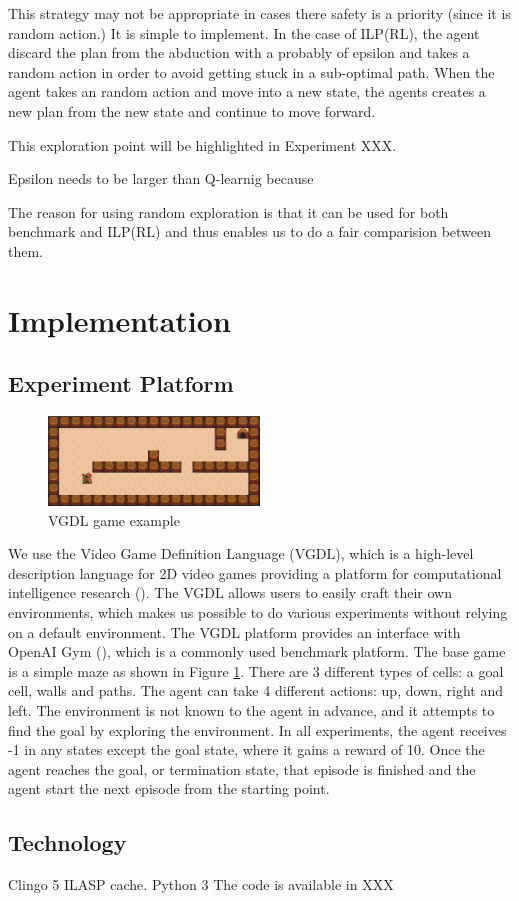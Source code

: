 This strategy may not be appropriate in cases there safety is a priority (since it is random action.)
It is simple to implement. 
In the case of ILP(RL), the agent discard the plan from the abduction with a probably of epsilon and takes a random action in order to avoid getting stuck in a sub-optimal path. 
When the agent takes an random action and move into a new state, the agents creates a new plan from the new state and continue to move forward.

This exploration point will be highlighted in Experiment XXX.

Epsilon needs to be larger than Q-learnig because

The reason for using random exploration is that it can be used for both benchmark and ILP(RL) and thus enables us to do a fair comparision between them.

\section{Implementation}
\label{Implementation}

\subsection{Experiment Platform}

\begin{figure}[!ht!b]
\centering
\includegraphics[width=0.5\textwidth]{./figures/experiment1}
\caption{VGDL game example}
\label{VGDL_sample}
\end{figure}    

We use the Video Game Definition Language (VGDL), which is a high-level description language for 2D video games providing a platform for computational intelligence research (\cite{Schaul2013}).
The VGDL allows users to easily craft their own environments, which makes us possible to do various experiments without relying on a default environment. The VGDL platform provides an interface with OpenAI Gym (\cite{Brockman2016}), which is a commonly used benchmark platform. 
The base game is a simple maze as shown in Figure \ref{VGDL_sample}.
There are 3 different types of cells: a goal cell, walls and paths. The agent can take 4 different actions: up, down, right and left.
The environment is not known to the agent in advance, and it attempts to find the goal by exploring the environment.
In all experiments, the agent receives -1 in any states except the goal state, where it gains a reward of 10.
Once the agent reaches the goal, or termination state, that episode is finished and the agent start the next episode from the starting point.

\subsection{Technology}

Clingo 5
ILASP cache.
Python 3
The code is available in XXX

